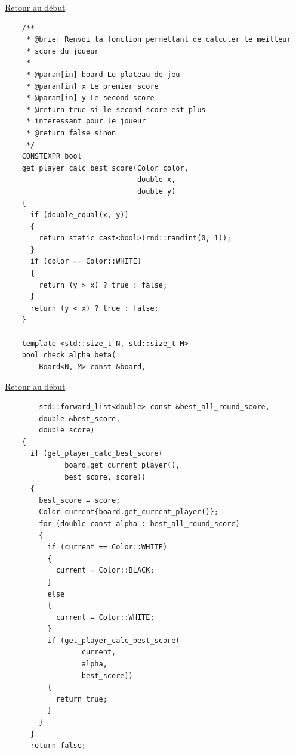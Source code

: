 {\begin{frame}[fragile]
\begin{verbatim}
\end{verbatim}
\end{frame}

\begin{frame}[fragile]
\hyperlink{conclusion}{Retour au début}\newline
\begin{verbatim}
    /**
     * @brief Renvoi la fonction permettant de calculer le meilleur
     * score du joueur
     *
     * @param[in] board Le plateau de jeu
     * @param[in] x Le premier score
     * @param[in] y Le second score
     * @return true si le second score est plus
     * interessant pour le joueur
     * @return false sinon
     */
    CONSTEXPR bool
    get_player_calc_best_score(Color color,
                               double x,
                               double y)
    {
      if (double_equal(x, y))
      {
        return static_cast<bool>(rnd::randint(0, 1));
      }
      if (color == Color::WHITE)
      {
        return (y > x) ? true : false;
      }
      return (y < x) ? true : false;
    }

    template <std::size_t N, std::size_t M>
    bool check_alpha_beta(
        Board<N, M> const &board,
\end{verbatim}
\end{frame}

\begin{frame}[fragile]
\hyperlink{conclusion}{Retour au début}\newline
\begin{verbatim}
        std::forward_list<double> const &best_all_round_score,
        double &best_score,
        double score)
    {
      if (get_player_calc_best_score(
              board.get_current_player(),
              best_score, score))
      {
        best_score = score;
        Color current{board.get_current_player()};
        for (double const alpha : best_all_round_score)
        {
          if (current == Color::WHITE)
          {
            current = Color::BLACK;
          }
          else
          {
            current = Color::WHITE;
          }
          if (get_player_calc_best_score(
                  current,
                  alpha,
                  best_score))
          {
            return true;
          }
        }
      }
      return false;
\end{verbatim}
\end{frame}

}
